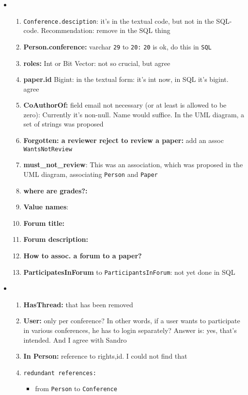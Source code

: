 \documentclass[11pt,handout,nologo]{handout}
\begin{document}
\begin{itemize}
\item 
  \begin{enumerate}
  \item \texttt{Conference.desciption}: it's in the textual code, but not in
    the SQL-code. Recommendation: remove in the SQL thing
  \item \textbf{Person.conference:} varchar \texttt{29} to \texttt{20:}
    \texttt{20} is ok, do this in \texttt{SQL}
  \item \textbf{roles:} Int or Bit Vector: not so crucial, but agree
  \item \textbf{paper.id} Bigint: in the textual form: it's int now, in SQL it's
    bigint. agree
  \item \textbf{CoAuthorOf:} field email not necessary (or at least is allowed
    to be zero): Currently it's non-null. Name would suffice. In the UML
    diagram, a set of strings was proposed
  \item \textbf{Forgotten: a reviewer reject to review a paper:} add an assoc
    \texttt{WantsNotReview}
  \item \textbf{must\_not\_review}: This was an association, which was proposed
    in the UML diagram, associating \texttt{Person} and \texttt{Paper}
  \item \textbf{where are grades?:} 
  \item \textbf{Value names}:
  \item \textbf{Forum title:}
  \item \textbf{Forum description:}
  \item \textbf{How to assoc. a forum to a paper?}
  \item \textbf{ParticipatesInForum} to \texttt{ParticipantsInForum}: not yet
    done in SQL
  \end{enumerate}
\item 
  \begin{enumerate}
  \item \textbf{HasThread:} that has been removed
  \item \textbf{User:} only per conference? In other words, if a user wants to
  participate in various conferences, he has to login separately? Answer is:
  yes, that's intended. And I agree with Sandro
\item \textbf{In Person:} reference to rights,id. I could not find that
\item \texttt{redundant references:}
  \begin{itemize}
  \item  from \texttt{Person} to  \texttt{Conference} 

\end{itemize}
\end{enumerate}
\end{itemize}
\end{document}
